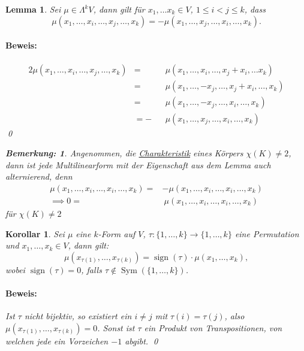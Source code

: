 \documentclass{report}
\DeclareMathOperator{\Sym}{Sym}
\DeclareMathOperator{\sign}{sign}
\theoremstyle{customrem}
\newtheorem*{bemerkung}{Bemerkung\textnormal:}
\theoremstyle{customdef}
\newtheorem{lemma}[definition]{Lemma}
\newtheorem{korrolar}[definition]{Korollar}
\renewenvironment{proof}{\paragraph{Beweis: }}{\qed}
\theoremstyle{customenv}
\begin{document}
	\begin{lemma}
		Sei \(\mu\in\Lambda^kV\), dann gilt für \(x_1,\ldots x_k\in V\), \(1\leq i<j\leq k\), dass \[\mu(x_1,\ldots, x_i,\ldots, x_j,\ldots, x_k) = -\mu(x_1,\ldots, x_j,\ldots, x_i,\ldots, x_k).\]
		\begin{proof}
			\begin{alignat*}{2}
				\mu(x_1,\ldots, x_i, \ldots, x_j, \ldots, x_k) 	&=  &&\mu(x_1, \ldots,  x_i, \ldots, x_j+x_i, \ldots x_k)\\
																&=  &&\mu(x_1, \ldots, -x_j, \ldots, x_j+x_i, \ldots, x_k)\\
																&=  &&\mu(x_1, \ldots, -x_j, \ldots, x_i, \ldots, x_k)\\
																&= -&&\mu(x_1, \ldots,  x_j, \ldots, x_i, \ldots, x_k)
			\end{alignat*}
		\end{proof}
		\begin{bemerkung}
			Angenommen, die \hyperref[lem142]{Charakteristik} eines Körpers \(\chi(K)\neq 2\), dann ist jede Multilinearform mit der Eigenschaft aus dem Lemma auch alternierend, denn
			\begin{align*}
				\mu(x_1, \ldots, x_i, \ldots, x_i, \ldots, x_k) =	& -\mu(x_1, \ldots, x_i, \ldots, x_i, \ldots, x_k)\\
														\implies 0=	&\  \mu(x_1, \ldots, x_i, \ldots, x_i, \ldots, x_k)
			\end{align*}
			für \(\chi(K)\neq 2\)
		\end{bemerkung}
	\end{lemma}
	
	\begin{korrolar}
		Sei \(\mu\) eine \(k\)-Form auf \(V\), \(\tau:\{1,\ldots, k\}\to\{1,\ldots, k\}\) eine Permutation und \(x_1,\ldots, x_k\in V\), dann gilt: \[\mu(x_{\tau(1)},\ldots, x_{\tau(k)}) = \sign(\tau)\cdot \mu(x_1,\ldots, x_k), \] wobei \(\sign(\tau)=0\), falls \(\tau\notin\Sym(\{1,\ldots, k\})\).
		\begin{proof}
			Ist \(\tau\) nicht bijektiv, so existiert ein \(i\neq j\) mit \(\tau(i)=\tau(j)\), also \(\mu(x_{\tau(1)},\ldots, x_{\tau(k)}) = 0\). Sonst ist \(\tau\) ein Produkt von Transpositionen, von welchen jede ein Vorzeichen \(-1\) abgibt.
		\end{proof}
	\end{korrolar}
	
\end{document}
